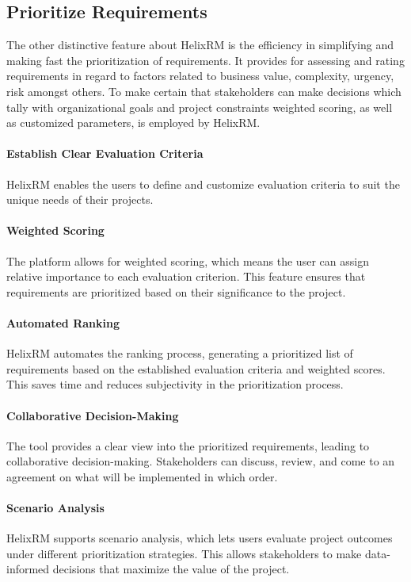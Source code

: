 \subsection{Prioritize Requirements}\label{subsec:prioritize-requirements}

The other distinctive feature about HelixRM is the efficiency in simplifying and making fast the prioritization of requirements.
It provides for assessing and rating requirements in regard to factors related to business value, complexity, urgency, risk amongst others.
To make certain that stakeholders can make decisions which tally with organizational goals and project constraints weighted scoring, as well as customized parameters, is employed by HelixRM\@.
\paragraph{Establish Clear Evaluation Criteria}
HelixRM enables the users to define and customize evaluation criteria to suit the unique needs of their projects.

\paragraph{Weighted Scoring}
The platform allows for weighted scoring, which means the user can assign relative importance to each evaluation criterion.
This feature ensures that requirements are prioritized based on their significance to the project.

\paragraph{Automated Ranking}
HelixRM automates the ranking process, generating a prioritized list of requirements based on the established evaluation criteria and weighted scores.
This saves time and reduces subjectivity in the prioritization process.

\paragraph{Collaborative Decision-Making}
The tool provides a clear view into the prioritized requirements, leading to collaborative decision-making.
Stakeholders can discuss, review, and come to an agreement on what will be implemented in which order.

\paragraph{Scenario Analysis}
HelixRM supports scenario analysis, which lets users evaluate project outcomes under different prioritization strategies.
This allows stakeholders to make data-informed decisions that maximize the value of the project.

